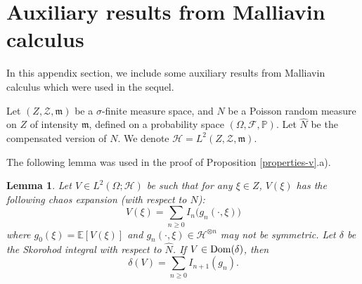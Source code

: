 \documentclass[12pt]{article}
\newtheorem{lemma}[theorem]{Lemma}
\def\cF{\mathcal{F}}
\def\cH{\mathcal{H}}
\def\cZ{\mathcal{Z}}
\def\bE{\mathbb{E}}
\def\bP{\mathbb{P}}
\newcommand{\fm}{\mathfrak{m}}
\begin{document}
\section{Auxiliary results from Malliavin calculus}
\label{appA}

In this appendix section, we include some auxiliary results from Malliavin calculus which were used in the sequel. 
\medskip

Let $(Z,\cZ,\fm)$ be a $\sigma$-finite measure space, and $N$ be a Poisson random measure on $Z$ of intensity $\fm$, defined on a probability space $(\Omega,\cF,\bP)$.  Let $\widehat{N}$ be the compensated version of $N$. 
We denote $\cH=L^2(Z,\cZ,\fm)$.


The following lemma was used in the proof of Proposition \ref{properties-v}.a).

\begin{lemma}
\label{Skor-lem}
Let $V \in L^2(\Omega;\cH)$ be such that for any $\xi \in Z$, $V(\xi)$ has the following chaos expansion (with respect to $N$):
\[
V(\xi)=\sum_{n\geq 0}I_n \big( g_n(\cdot,\xi)\big)
\]
where $g_0(\xi)=\bE[V(\xi)]$ and $g_n(\cdot,\xi) \in \cH^{\otimes n}$ may not be symmetric. Let $\delta$ be the Skorohod integral with respect to $\widehat{N}$. If $V \in {\rm Dom}(\delta)$, then
\[
\delta(V)=\sum_{n\geq 0}I_{n+1}(g_n).
\]
\end{lemma}
\end{document}
